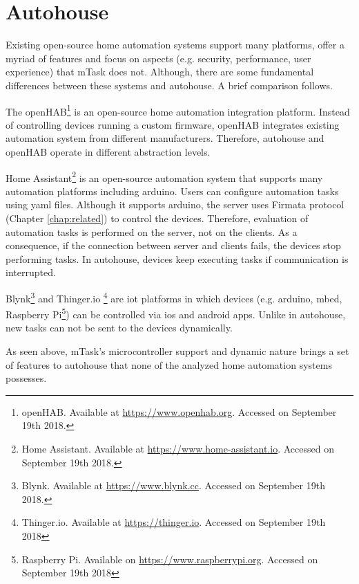 \section{Autohouse}

Existing open-source home automation systems support many platforms, offer a myriad of features and focus on aspects (e.g. security, performance, user experience) that \gls{mTask} does not. Although, there are some fundamental differences between these systems and \gls{autohouse}. A brief comparison follows.

The openHAB\footnote{openHAB. Available at \url{https://www.openhab.org}. Accessed on September 19th 2018.} is an open-source home automation integration platform. Instead of controlling devices running a custom firmware, openHAB integrates existing automation system from different manufacturers. Therefore, \gls{autohouse} and openHAB operate in different abstraction levels.

Home Assistant\footnote{Home Assistant. Available at \url{https://www.home-assistant.io}. Accessed on September 19th 2018.} is an open-source automation system that supports many automation platforms including \gls{arduino}. Users can configure automation tasks using \gls{yaml} files. Although it supports \gls{arduino}, the server uses Firmata protocol (Chapter \ref{chap:related}) to control the devices. Therefore, evaluation of automation tasks is performed on the server, not on the clients. As a consequence, if the connection  between server and clients fails, the devices stop performing tasks. In \gls{autohouse}, devices keep executing tasks if communication is interrupted.

Blynk\footnote{Blynk. Available at \url{https://www.blynk.cc}. Accessed on September 19th 2018.} and Thinger.io \footnote{Thinger.io. Available at \url{https://thinger.io}. Accessed on September 19th 2018} are \ac{iot} platforms in which devices (e.g. \gls{arduino}, \gls{mbed}, Raspberry Pi\footnote{Raspberry Pi. Available on \url{https://www.raspberrypi.org}. Accessed on September 19th 2018}) can be controlled via \gls{ios} and \gls{android} apps. Unlike in \gls{autohouse}, new tasks can not be sent to the devices dynamically. 

As seen above, \gls{mTask}'s microcontroller support and dynamic nature brings a set of features to \gls{autohouse} that none of the analyzed home automation systems possesses.